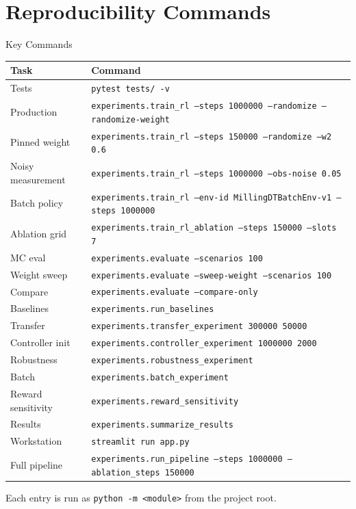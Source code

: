 ﻿\documentclass[11pt,aspectratio=169]{beamer}
\begin{document}
\appendix
\section{Reproducibility Commands}

\begin{frame}{Key Commands}
    \scriptsize
    \begin{tabular}{@{}ll@{}}
    \toprule
    \textbf{Task} & \textbf{Command} \\
    \midrule
    Tests & \texttt{pytest tests/ -v} \\
    Production & \texttt{experiments.train\_rl --steps 1000000 --randomize --randomize-weight} \\
    Pinned weight & \texttt{experiments.train\_rl --steps 150000 --randomize --w2 0.6} \\
    Noisy measurement & \texttt{experiments.train\_rl --steps 1000000 --obs-noise 0.05} \\
    Batch policy & \texttt{experiments.train\_rl --env-id MillingDTBatchEnv-v1 --steps 1000000} \\
    Ablation grid & \texttt{experiments.train\_rl\_ablation --steps 150000 --slots 7} \\
    MC eval & \texttt{experiments.evaluate --scenarios 100} \\
    Weight sweep & \texttt{experiments.evaluate --sweep-weight --scenarios 100} \\
    Compare & \texttt{experiments.evaluate --compare-only} \\
    Baselines & \texttt{experiments.run\_baselines} \\
    Transfer & \texttt{experiments.transfer\_experiment 300000 50000} \\
    Controller init & \texttt{experiments.controller\_experiment 1000000 2000} \\
    Robustness & \texttt{experiments.robustness\_experiment} \\
    Batch & \texttt{experiments.batch\_experiment} \\
    Reward sensitivity & \texttt{experiments.reward\_sensitivity} \\
    Results & \texttt{experiments.summarize\_results} \\
    Workstation & \texttt{streamlit run app.py} \\
    Full pipeline & \texttt{experiments.run\_pipeline --steps 1000000 --ablation\_steps 150000} \\
    \bottomrule
    \end{tabular}

    \vspace{0.3em}
    {\footnotesize Each entry is run as \texttt{python -m <module>} from the project root.}
\end{frame}
\end{document}
